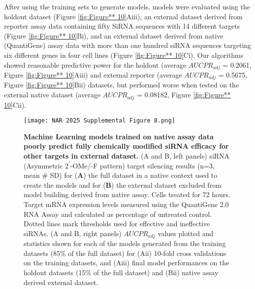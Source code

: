 \documentclass{report}
\begin{document}
After using the training sets to generate models, models were evaluated using the holdout dataset (Figure \ref{fig:Figure** 10}Aiii), an external dataset derived from reporter assay data containing fifty SiRNA sequences with 14 different targets (Figure \ref{fig:Figure** 10}Bi), and an external dataset derived from native (QuantiGene) assay data with more than one hundred siRNA sequences targeting six different genes in four cell lines (Figure \ref{fig:Figure** 10}Ci). Our algorithms showed reasonable predictive power for the holdout (average $AUCPR_{adj}$ = 0.2061, Figure \ref{fig:Figure** 10}Aiii) and external reporter (average $AUCPR_{adj}$ = 0.5675, Figure \ref{fig:Figure** 10}Bii) datasets, but performed worse when tested on the external native dataset (average $AUCPR_{adj}$ = 0.08182, Figure \ref{fig:Figure** 10}Cii).
\begin{figure}
    \centering
    \texttt{[image: NAR 2025 Supplemental Figure 8.png]}
    \caption{ \textbf{Machine Learning models trained on native assay data poorly predict fully chemically modified siRNA efficacy for other targets in external dataset. }(A and B, left panels) siRNA (Asymmetric $2^\prime$-OMe/-F pattern) target silencing results (n=3, mean \# SD) for (\textbf{A}) the full dataset in a native context used to create the models and for (\textbf{B}) the external dataset excluded from model building derived from native assay. Cells treated for 72 hours. Target mRNA expression levels measured using the QuantiGene 2.0 RNA Assay and calculated as percentage of untreated control. Dotted lines mark thresholds used for effective and ineffective siRNAs. (A and B, right panels) $AUCPR_{adj}$ values plotted and statistics shown for each of the models generated from the training datasets (85\% of the full dataset) for (Aii) 10-fold cross validations on the training datasets, and (Aiii) final model performances on the holdout datasets (15\% of the full dataset) and (Bii) native assay derived external dataset.
}
    \label{fig:Supplemental Figure** 8}
\end{figure}
\end{document}
